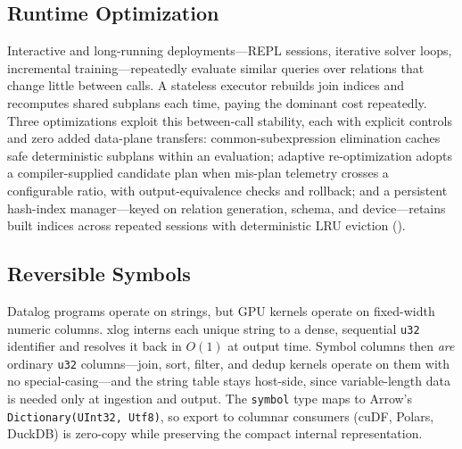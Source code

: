 \subsection{Runtime Optimization}

Interactive and long-running deployments---REPL sessions, iterative solver loops, incremental training---repeatedly evaluate similar queries over relations that change little between calls. A stateless executor rebuilds join indices and recomputes shared subplans each time, paying the dominant cost repeatedly. Three optimizations exploit this between-call stability, each with explicit controls and zero added data-plane transfers: common-subexpression elimination caches safe deterministic subplans within an evaluation; adaptive re-optimization adopts a compiler-supplied candidate plan when mis-plan telemetry crosses a configurable ratio, with output-equivalence checks and rollback; and a persistent hash-index manager---keyed on relation generation, schema, and device---retains built indices across repeated sessions with deterministic LRU eviction ().

\subsection{Reversible Symbols}

Datalog programs operate on strings, but GPU kernels operate on fixed-width numeric columns. xlog interns each unique string to a dense, sequential \texttt{u32} identifier and resolves it back in $O(1)$ at output time. Symbol columns then \emph{are} ordinary \texttt{u32} columns---join, sort, filter, and dedup kernels operate on them with no special-casing---and the string table stays host-side, since variable-length data is needed only at ingestion and output. The \texttt{symbol} type maps to Arrow's \texttt{Dictionary(UInt32, Utf8)}, so export to columnar consumers (cuDF, Polars, DuckDB) is zero-copy while preserving the compact internal representation.
